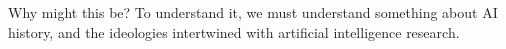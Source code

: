 Why might this be? To understand it, we must understand something
about AI history, and the ideologies intertwined with artificial
intelligence research.



